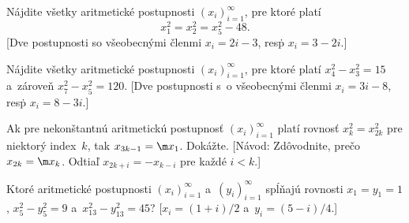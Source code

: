 {Nájdite všetky aritmetické postupnosti
$(x_i)_{i=1}^{\infty}$, pre ktoré platí
$$
x_1^2=x_2^2=x_5^2-48.
$$
[Dve postupnosti so všeobecnými členmi $x_i=2i-3$, resp\. $x_i=3-2i$.]

Nájdite všetky aritmetické postupnosti $(x_i)_{i=1}^{\infty}$,
pre ktoré platí $x_4^2-x_3^2=15$ a~zároveň $x_7^2-x_5^2=120$.
[Dve postupnosti s~o všeobecnými členmi $x_i=3i-8$, resp\. $x_i=8-3i$.]

Ak pre nekonštantnú
aritmetickú postupnosť $(x_i)_{i=1}^{\infty}$ platí rovnosť
$x_{k}^2=x_{2k}^2$ pre niektorý index~$k$, tak
$x_{3k-1}=\m x_{1}$. Dokážte. [Návod: Zdôvodnite, prečo
$x_{2k}=\m x_{k}$. Odtiaľ $x_{2k+i}={-x_{k-i}}$ pre každé
$i<k$.]

Ktoré aritmetické postupnosti $(x_i)_{i=1}^{\infty}$
a~$(y_i)_{i=1}^{\infty}$ spĺňajú rovnosti $x_1=y_1=1$,
$x_{5}^2-y_{5}^2=9$ a~$x_{13}^2-y_{13}^2=45$? [$x_i=(1+i)/2$
a~$y_i=(5-i)/4$.]
}

